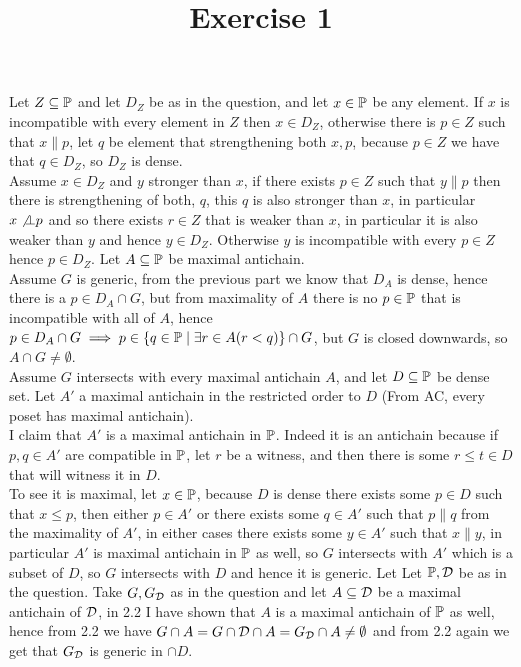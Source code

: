 

\title{Exercise 1}

\maketitle
\ex[2]{}
\sub{}
	Let $Z\subseteq\P$ and let $D_Z$ be as in the question, and let $x\in\P$ be any element.
	If $x$ is incompatible with every element in $Z$ then $x\in D_Z$, otherwise there is $p\in Z$ such that $x\| p$, let $q$ be element that strengthening both $x,p$, because $p\in Z$ we have that $q\in D_Z$, so $D_Z$ is dense.\\
	Assume $x\in D_Z$ and $y$ stronger than $x$, if there exists $p\in Z$ such that $y\|p$ then there is strengthening of both, $q$, this $q$ is also stronger than $x$, in particular $x\not\bot p$ and so there exists $r\in Z$ that is weaker than $x$, in particular it is also weaker than $y$ and hence $y\in D_Z$. Otherwise $y$ is incompatible with every $p\in Z$ hence $p\in D_Z$.
\sub{}
	Let $A\subseteq \P$ be maximal antichain. \\
	Assume $G$ is generic, from the previous part we know that $D_A$ is dense, hence there is a $p\in D_A\cap G$, but from maximality of $A$ there is no $p\in \P$ that is incompatible with all of $A$, hence $p\in D_A\cap G\implies p\in\{q\in \P\mid \exists r\in A(r<q)\}\cap G$, but $G$ is closed downwards, so $A\cap G\ne\emptyset$.\\
	Assume $G$ intersects with every maximal antichain $A$, and let $D\subseteq\P$ be dense set. Let $A'$ a maximal antichain in the restricted order to $D$ (From AC, every poset has maximal antichain).\\
	I claim that $A'$ is a maximal antichain in $\P$. Indeed it is an antichain because if $p,q\in A'$ are compatible in $\P$, let $r$ be a witness, and then there is some $r\le t\in D$ that will witness it in $D$. \\
	To see it is maximal, let $x\in \P$, because $D$ is dense there exists some $p\in D$ such that $x\le p$, then either $p\in A'$ or there exists some $q\in A'$ such that $p\|q$ from the maximality of $A'$, in either cases there exists some $y\in A'$ such that $x\|y$, in particular $A'$ is maximal antichain in $\P$ as well, so $G$ intersects with $A'$ which is a subset of $D$, so $G$ intersects with $D$ and hence it is generic.
\newpage
\ex[4]{}
Let Let $\P,\cal D$ be as in the question.
\sub{}
	Take $G,G_{\cal D}$ as in the question and let $A\subseteq \cal D$ be a maximal antichain of $\cal D$, in 2.2 I have shown that $A$ is a maximal antichain of $\P$ as well, hence from 2.2 we have $G\cap A=G\cap \cal D\cap A=G_{\cal D}\cap A\ne\emptyset$ and from 2.2 again we get that $G_\cal{D}$ is generic in $\cap D$.
